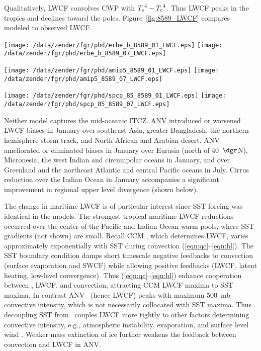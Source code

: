 \documentclass[agums]{aguplus}
\begin{document}
Qualitatively, LWCF convolves CWP with $\mbox{$T_\mathrm{s}$}^4 - \mbox{$T_\mathrm{c}$}^4$.
Thus LWCF peaks in the tropics and declines toward the poles.
Figure~\ref{fig:8589_LWCF} compares modeled to observed LWCF.
\begin{figure*}[p]
\begin{center}
\texttt{[image: /data/zender/fgr/phd/erbe\_b\_8589\_01\_LWCF.eps]}%
\texttt{[image: /data/zender/fgr/phd/erbe\_b\_8589\_07\_LWCF.eps]}%

\texttt{[image: /data/zender/fgr/phd/amip5\_8589\_01\_LWCF.eps]}%
\texttt{[image: /data/zender/fgr/phd/amip5\_8589\_07\_LWCF.eps]}%

\texttt{[image: /data/zender/fgr/phd/spcp\_85\_8589\_01\_LWCF.eps]}%
\texttt{[image: /data/zender/fgr/phd/spcp\_85\_8589\_07\_LWCF.eps]}%
\end{center}
\caption[Geographic distribution of longwave cloud forcing LWCF
for 1985--1989 January and July ERBE, CCM, and ANV]{
Geographic distribution of longwave cloud forcing LWCF (\wxmS) for
1985--1989 January and July (a,b) ERBE, (c,d) CCM, and (e,f) ANV. 
\label{fig:8589_LWCF}}   
\end{figure*}
Neither model captures the mid-oceanic ITCZ.
ANV introduced or worsened LWCF biases in January over southeast Asia,
greater Bangladesh, the northern hemisphere storm track, and North
African and Arabian desert.
ANV ameliorated or eliminated biases in January over Eurasia (north of
40~$\dgr$N), Micronesia, the west Indian and circumpolar oceans
in January, and over Greenland and the northeast Atlantic and central
Pacific oceans in July.
Cirrus reduction over the Indian Ocean in January accompanies a
significant improvement in regional upper level divergence (shown
below).  

The change in maritime LWCF is of particular interest since SST
forcing was identical in the models.
The strongest tropical maritime LWCF reductions occurred over the
center of the Pacific and Indian Ocean warm pools, where SST gradients
(not shown) are small.
Recall CCM \qc, which determines LWCF, varies approximately
exponentially with SST during convection
(\ref{eqn:qc}--\ref{eqn:hl}). 
The SST boundary condition damps short timescale negative feedbacks to
convection (surface evaporation and SWCF) while allowing positive
feedbacks (LWCF, latent heating, low-level convergence).  
Thus (\ref{eqn:qc}--\ref{eqn:hl}) enhance cooperation between \qc,
LWCF, and convection, attracting CCM LWCF maxima to SST maxima. 
In contrast ANV \qc\ (hence LWCF) peaks with maximum 500~mb convective
intensity, which is not necessarily collocated with SST maxima. 
Thus decoupling SST from \qc\ couples LWCF more tightly to other
factors determining convective intensity, e.g., atmospheric
instability, evaporation, and surface level wind \cite[]{FDR90,Hac94}.
Weaker mass extinction of ice further weakens the feedback between
convection and LWCF in ANV.
\end{document}
